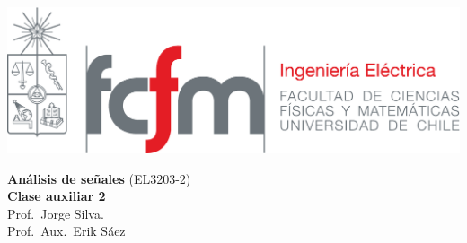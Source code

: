 \documentclass[
  11pt,
  letterpaper,
   addpoints,
   answers
  ]{exam}
\begin{document}
\noindent
\begin{minipage}{0.47\textwidth}
\includegraphics[width=\textwidth]{../fcfm_die}
\end{minipage}
\begin{minipage}{0.53\textwidth}
\begin{center} 
\large\textbf{Análisis de señales} (EL3203-2) \\
\large\textbf{Clase auxiliar 2} \\
\normalsize Prof.~Jorge Silva.\\
\normalsize Prof.~Aux.~Erik Sáez
\end{center}
\end{minipage}

\vspace{0.5cm}
\noindent
\vspace{.85cm}
\end{document}
